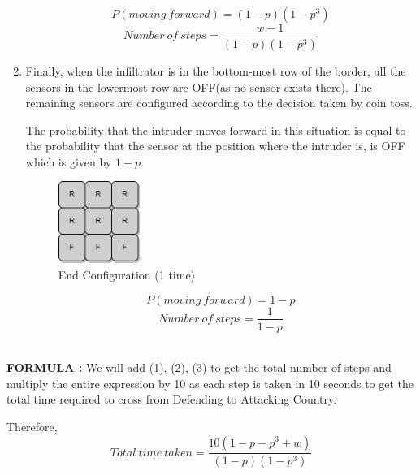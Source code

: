 \documentclass[12pt]{article}
\begin{document}
\begin{enumerate}
\[P(moving\: forward) = (1 - p)(1 - p^3)\]
\begin{equation}
Number\: of\: steps = \frac{w - 1}{(1 - p)(1 - p^3)}
\end{equation}

 \item Finally, when the infiltrator is in the bottom-most row of the border, all the sensors in the lowermost row are OFF(as no sensor exists there). The remaining sensors are configured according to the decision taken by coin toss.
 
 The probability that the intruder moves forward in this situation is equal to the probability that the sensor at the position where the intruder is, is OFF which is given by $1 - p$.
    \begin{figure}[t]
    \centering
    \includegraphics[width=0.25\textwidth]{End.drawio.png}
    \caption{End Configuration (1 time)}
    \label{fig:mesh1}
    \end{figure}
\[P(moving\: forward) = 1 - p\]
\[Number\: of\: steps = \frac{1}{1 - p}\]
\end{enumerate} \\
\textbf{FORMULA : } 
We will add (1), (2), (3) to get the total number of steps and multiply the entire expression by 10 as each step is taken in 10 seconds to get the total time required to cross from Defending to Attacking Country.

Therefore,
\begin{equation}
    Total\: time\: taken = \frac{10(1 - p - p^3 + w)}{(1 - p)(1 - p^3)}
\end{equation}

\end{document}
